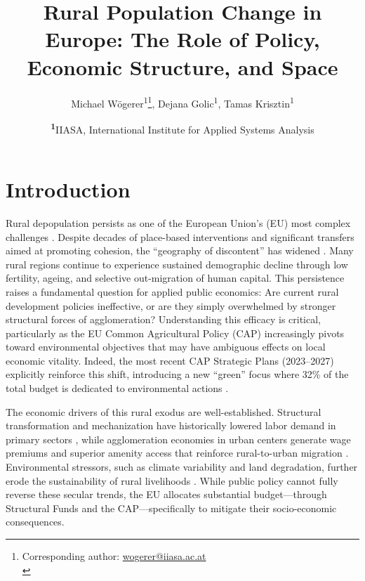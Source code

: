 \documentclass[
	a4paper, %
	10pt, %
]{LTJournalArticle}
\title{Rural Population Change in Europe: The Role of Policy, Economic Structure, and Space} %
\author{%
	Michael Wögerer\textsuperscript{1}\thanks{Corresponding author: \href{mailto:wogerer@iiasa.ac.at}{wogerer@iiasa.ac.at}\\}, 
    Dejana Golic\textsuperscript{1},
    Tamas Krisztin\textsuperscript{1}
}
\date{\footnotesize\textsuperscript{\textbf{1}}IIASA, International Institute for Applied Systems Analysis}
\begin{document}
{\let \newpage \relax \maketitle}


\section{Introduction}

Rural depopulation persists as one of the European Union's (EU) most complex challenges . Despite decades of place-based interventions and significant transfers aimed at promoting cohesion, the ``geography of discontent'' has widened \citep{RodriguezPose2018, McCann2019}. Many rural regions continue to experience sustained demographic decline through low fertility, ageing, and selective out-migration of human capital. This persistence raises a fundamental question for applied public economics: Are current rural development policies ineffective, or are they simply overwhelmed by stronger structural forces of agglomeration? Understanding this efficacy is critical, particularly as the EU Common Agricultural Policy (CAP) increasingly pivots toward environmental objectives that may have ambiguous effects on local economic vitality. Indeed, the most recent CAP Strategic Plans (2023--2027) explicitly reinforce this shift, introducing a new ``green'' focus where 32\% of the total budget is dedicated to environmental actions \citep{EC_CAP_2023}.

The economic drivers of this rural exodus are well-established. Structural transformation and mechanization have historically lowered labor demand in primary sectors \citep{Collantes2011}, while agglomeration economies in urban centers generate wage premiums and superior amenity access that reinforce rural-to-urban migration \citep{Glaeser2009, UN2019, montgomery2013cities, lichter2025depopulation}. Environmental stressors, such as climate variability and land degradation, further erode the sustainability of rural livelihoods \citep{Salvati2010}. While public policy cannot fully reverse these secular trends, the EU allocates substantial budget—through Structural Funds and the CAP—specifically to mitigate their socio-economic consequences.
\end{document}
